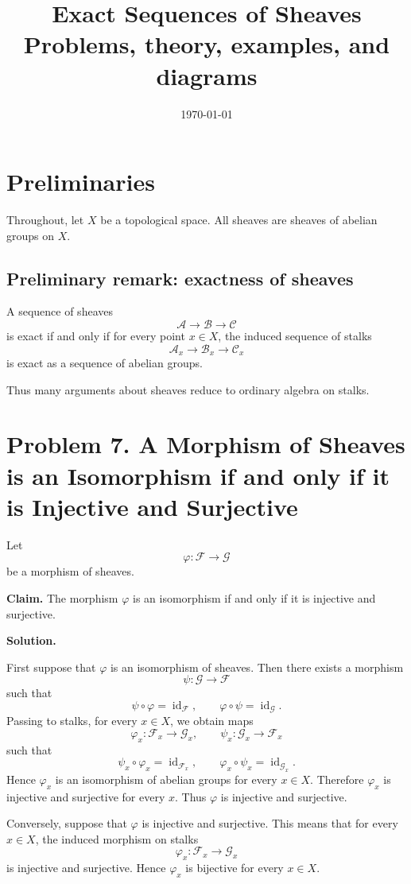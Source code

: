\documentclass[12pt,a4paper]{article}
\title{\bfseries Exact Sequences of Sheaves\\


\large Problems, theory, examples, and diagrams}
\author{}
\date{\today}
\DeclareMathOperator{\id}{id}
\newcommand{\F}{\mathcal F}
\newcommand{\G}{\mathcal G}
\theoremstyle{notespace}
\begin{document}
\maketitle
\tableofcontents
\clearpage


\section{Preliminaries}

Throughout, let \(X\) be a topological space. All sheaves are sheaves of abelian groups on \(X\).

\subsection{Preliminary remark: exactness of sheaves}

A sequence of sheaves
\[
\mathcal A \longrightarrow \mathcal B \longrightarrow \mathcal C
\]
is exact if and only if for every point \(x\in X\), the induced sequence of stalks
\[
\mathcal A_x \longrightarrow \mathcal B_x \longrightarrow \mathcal C_x
\]
is exact as a sequence of abelian groups.

Thus many arguments about sheaves reduce to ordinary algebra on stalks.


\section{Problem 7. A Morphism of Sheaves is an Isomorphism if and only if it is Injective and Surjective}

Let
\[
\varphi:\F \longrightarrow \G
\]
be a morphism of sheaves.

\textbf{Claim.} The morphism \(\varphi\) is an isomorphism if and only if it is injective and surjective.

\textbf{Solution.}

First suppose that \(\varphi\) is an isomorphism of sheaves. Then there exists a morphism
\[
\psi:\G\longrightarrow \F
\]
such that
\[
\psi\circ \varphi=\id_{\F},
\qquad
\varphi\circ \psi=\id_{\G}.
\]
Passing to stalks, for every \(x\in X\), we obtain maps
\[
\varphi_x:\F_x\longrightarrow \G_x,
\qquad
\psi_x:\G_x\longrightarrow \F_x
\]
such that
\[
\psi_x\circ \varphi_x=\id_{\F_x},
\qquad
\varphi_x\circ \psi_x=\id_{\G_x}.
\]
Hence \(\varphi_x\) is an isomorphism of abelian groups for every \(x\in X\). Therefore \(\varphi_x\) is injective and surjective for every \(x\). Thus \(\varphi\) is injective and surjective.

Conversely, suppose that \(\varphi\) is injective and surjective. This means that for every \(x\in X\), the induced morphism on stalks
\[
\varphi_x:\F_x\longrightarrow \G_x
\]
is injective and surjective. Hence \(\varphi_x\) is bijective for every \(x\in X\).
\end{document}
